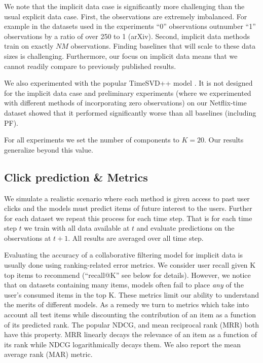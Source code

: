\documentclass{sig-alternate}
\begin{document}
We note that the implicit data case is significantly more challenging than
the usual explicit data case. First, the observations are extremely
imbalanced. For example in the datasets used in the experiments ``0''
observations outnumber ``1'' observations by a ratio of over 250 to 1 (arXiv). 
Second, implicit data methods train on exactly $NM$ observations. Finding
baselines that will scale to these data sizes is challenging. Furthermore, our
focus on implicit data means that we cannot readily compare to previously
published results.  

We also experimented with the popular TimeSVD++ model
\citep{DBLP:journals/cacm/Koren10}. It is not designed for the implicit data
case and preliminary experiments (where we experimented with different methods
of incorporating zero observations) on our Netflix-time dataset showed that it
performed significantly worse than all baselines (including PF).

For all experiments we set the number of components to $K=20$. Our results
generalize beyond this value. 


\subsection{Click prediction \& Metrics}
\label{sec:results_compare}
\noindent
We simulate a realistic scenario where each method is given access to past user
clicks and the models must predict items of future interest to the users.
Further for each dataset we repeat this process for each time step. That is for
each time step $t$ we train with all data available at $t$ and evaluate
predictions on the observations at $t+1$. All results are averaged over all
time step.

Evaluating the accuracy of a collaborative filtering model for implicit data is
usually done using ranking-related error metrics.  We consider user recall
given K top items to recommend (``recall@K'' see below for details). 
However, we notice that on datasets
containing many items, models often fail to place \emph{any} of the user's
consumed items in the top K. These metrics limit our ability to understand
the merits of different models.
As a remedy we turn to metrics which take into account all
test items while discounting the contribution of an item as a function of
its predicted rank.  The popular NDCG, and mean reciprocal rank (MRR) both
have this property.  MRR linearly decays the relevance of an item as a
function of its rank while NDCG logarithmically decays them. We also report
the mean average rank (MAR) metric. 
\end{document}
